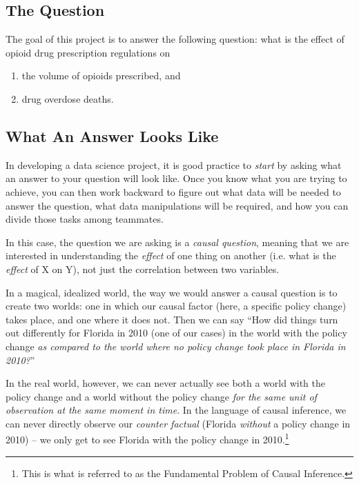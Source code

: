 \documentclass[12pt]{article}
\begin{document}
\subsection*{The Question}

The goal of this project is to answer the following question: what is the effect of opioid drug prescription regulations on

\begin{enumerate}
  \item the volume of opioids prescribed, and
  \item drug overdose deaths.
\end{enumerate}

\subsection*{What An Answer Looks Like}

In developing a data science project, it is good practice to \emph{start} by asking what an answer to your question will look like. Once you know what you are trying to achieve, you can then work backward to figure out what data will be needed to answer the question, what data manipulations will be required, and how you can divide those tasks among teammates.

In this case, the question we are asking is a \emph{causal question}, meaning that we are interested in understanding the \emph{effect} of one thing on another (i.e. what is the \emph{effect} of X on Y), not just the correlation between two variables.

In a magical, idealized world, the way we would answer a causal question is to create two worlds: one in which our causal factor (here, a specific policy change) takes place, and one where it does not. Then we can say ``How did things turn out differently for Florida in 2010 (one of our cases) in the world with the policy change \emph{as compared to the world where no policy change took place in Florida in 2010?}''

In the real world, however, we can never actually see both a world with the policy change and a world without the policy change \emph{for the same unit of observation at the same moment in time}. In the language of causal inference, we can never directly observe our \emph{counter factual} (Florida \emph{without} a policy change in 2010) -- we only get to see Florida with the policy change in 2010.\footnote{This is what is referred to as the Fundamental Problem of Causal Inference.}
\end{document}
